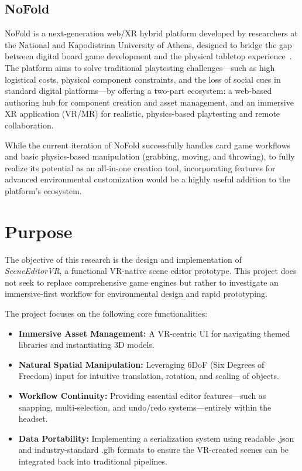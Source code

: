 \documentclass[inscr,ack,preface]{dithesis}
\begin{document}
\subsection{NoFold}

NoFold is a next-generation web/XR hybrid platform developed by researchers at the National and Kapodistrian University of Athens,
designed to bridge the gap between digital board game development and the physical tabletop experience~\cite{Lougiakis2024NoFold}.
The platform aims to solve traditional playtesting challenges---such as high logistical costs, physical component constraints, and the
loss of social cues in standard digital platforms---by offering a two-part ecosystem: a web-based authoring hub for component creation and
asset management, and an immersive XR application (VR/MR) for realistic, physics-based playtesting and remote collaboration.

While the current iteration of NoFold successfully handles card game workflows and basic physics-based manipulation
(grabbing, moving, and throwing), to fully realize its potential as an all-in-one creation tool,
incorporating features for advanced environmental customization would be a highly useful addition to the platform's ecosystem.

\section{Purpose}
The objective of this research is the design and implementation of \textit{SceneEditorVR}, a functional VR-native scene editor prototype.
This project does not seek to replace comprehensive game engines but rather to investigate an immersive-first workflow for environmental
design and rapid prototyping.

The project focuses on the following core functionalities:
\begin{itemize}
  \item \textbf{Immersive Asset Management:} A VR-centric UI for navigating themed libraries and instantiating 3D models.
  \item \textbf{Natural Spatial Manipulation:} Leveraging 6DoF (Six Degrees of Freedom) input for intuitive translation, rotation,
        and scaling of objects.
  \item \textbf{Workflow Continuity:} Providing essential editor features—such as snapping, multi-selection, and undo/redo systems—entirely
        within the headset.
  \item \textbf{Data Portability:} Implementing a serialization system using readable .json and industry-standard .glb formats to ensure the
        VR-created scenes can be integrated back into traditional pipelines.
\end{itemize}
\end{document}
